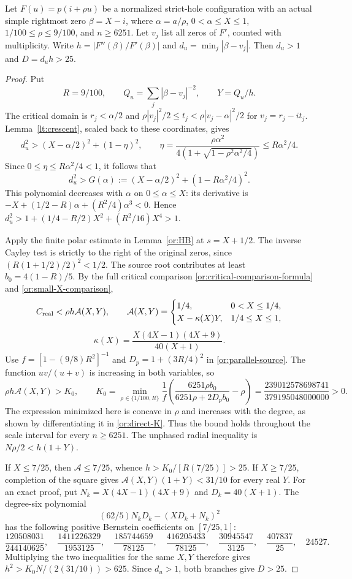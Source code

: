 \begin{lemma}\label{sm:normalized-D25}
Let $F(u)=p(i+\rho u)$ be a normalized strict-hole configuration
with an actual simple rightmost zero $\beta=X-i$, where
$\alpha=a/\rho$, $0<\alpha\le X\le1$,
$1/100\le\rho\le9/100$, and $n\ge6251$.
Let $v_j$ list all zeros of $F'$, counted with multiplicity.
Write $h=|F''(\beta)/F'(\beta)|$ and
$d_u=\min_j|\beta-v_j|$. Then $d_u>1$ and $D=d_uh>25$.
\end{lemma}
\begin{proof}
Put
\[
 R=9/100,\qquad Q_u=\sum_j|\beta-v_j|^{-2},\qquad Y=Q_u/h.
\]
The critical domain is
$r_j<\alpha/2$ and
$\rho|v_j|^2/2\le t_j<\rho|v_j-\alpha|^2/2$ for
$v_j=r_j-it_j$. Lemma~\ref{lt:crescent}, scaled back to these
coordinates, gives
\[
 d_u^2>(X-\alpha/2)^2+(1-\eta)^2,\qquad
 \eta=\frac{\rho\alpha^2}{4(1+\sqrt{1-\rho^2\alpha^2/4})}
       \le R\alpha^2/4.
\]
Since $0\le\eta\le R\alpha^2/4<1$, it follows that
\[
 d_u^2>G(\alpha):=(X-\alpha/2)^2+(1-R\alpha^2/4)^2.
\]
This polynomial decreases with $\alpha$ on $0\le\alpha\le X$:
its derivative is
$-X+(1/2-R)\alpha+(R^2/4)\alpha^3<0$.
Hence $d_u^2>1+(1/4-R/2)X^2+(R^2/16)X^4>1$.

Apply the finite polar estimate in Lemma~\ref{or:HB} at
$s=X+1/2$. The inverse Cayley test is strictly to the right of
the original zeros, since $(R(1+1/2)/2)^2<1/2$.
The source root contributes at least
$b_0=4(1-R)/5$. By the full critical comparison
\eqref{or:critical-comparison-formula} and
\eqref{or:small-X-comparison},
\[
 C_{\rm real}<\rho h\mathcal A(X,Y),\qquad
 \mathcal A(X,Y)=
 \begin{cases}1/4,&0<X\le1/4,\\
 X-\kappa(X)Y,&1/4\le X\le1,
 \end{cases}
\]
\[
 \kappa(X)=\frac{X(4X-1)(4X+9)}{40(X+1)}.
\]
Use $f=[1-(9/8)R^2]^{-1}$ and $D_p=1+(3R/4)^2$ in
\eqref{or:parallel-source}. The function $uv/(u+v)$ is increasing
in both variables, so
\begin{equation}\label{sm:normalized-source}
 \rho h\mathcal A(X,Y)>K_0,\qquad
 K_0=\min_{\rho\in\{1/100,R\}}
 \frac1f\left(\frac{6251\rho b_0}{6251\rho+2D_pb_0}-\rho\right)
 =\frac{239012578698741}{379195048000000}>0.
\end{equation}
The expression minimized here is concave in $\rho$
and increases with the degree, as shown by differentiating it in
\eqref{or:direct-K}. Thus the bound holds throughout the scale interval
for every $n\ge6251$. The unphased radial inequality is
$N\rho/2<h(1+Y)$.

If $X\le7/25$, then $\mathcal A\le7/25$, whence
$h>K_0/[R(7/25)]>25$.
If $X\ge7/25$, completion of the square gives
$\mathcal A(X,Y)(1+Y)<31/10$ for every real $Y$.
For an exact proof, put $N_k=X(4X-1)(4X+9)$ and $D_k=40(X+1)$.
The degree-six polynomial
\[
 (62/5)N_kD_k-(XD_k+N_k)^2
\]
has the following positive Bernstein coefficients on $[7/25,1]$:
\[
 \frac{120508031}{244140625},\quad
 \frac{1411226329}{1953125},\quad
 \frac{185744659}{78125},\quad
 \frac{416205433}{78125},\quad
 \frac{30945547}{3125},\quad
 \frac{407837}{25},\quad24527.
\]
Multiplying the two inequalities for the same $X,Y$ therefore gives
$h^2>K_0N/(2(31/10))>625$. Since $d_u>1$, both branches give
$D>25$.
\end{proof}

